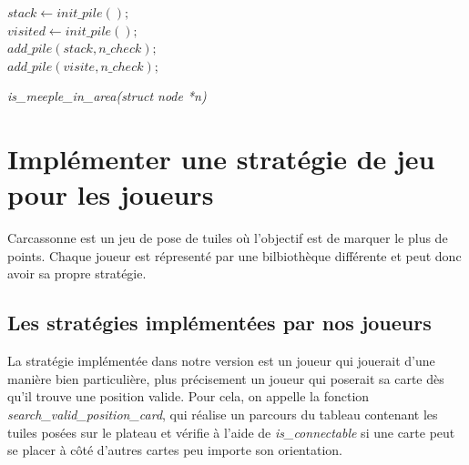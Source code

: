 \documentclass[12pt]{article}
\begin{document}
\LinesNumbered
\DontPrintSemicolon
\begin{algorithm}

{$stack \leftarrow init\_pile();$}\\
{$visited \leftarrow init\_pile();$}\\
{$add\_pile(stack, n\_check);$}\\
{$add\_pile(visite, n\_check);$}\\
\caption{\textit{is\_meeple\_in\_area(struct node *n)}} \label{z}
\end{algorithm}

\newpage

\section{Implémenter une stratégie de jeu pour les joueurs}

Carcassonne est un jeu de pose de tuiles où l'objectif est de marquer le plus de points. Chaque joueur est répresenté par une bilbiothèque différente et peut donc avoir sa propre stratégie.\\

\subsection{Les stratégies implémentées par nos joueurs}

La stratégie implémentée dans notre version est un joueur qui jouerait d'une manière bien particulière, plus précisement un joueur qui poserait sa carte dès qu'il trouve une position valide. Pour cela, on appelle la fonction \textit{search\_valid\_position\_card}, qui réalise un parcours du tableau contenant les tuiles posées sur le plateau et vérifie à l'aide de \textit{is\_connectable} si une carte peut se placer à côté d'autres cartes peu importe son orientation.\\
\end{document}

